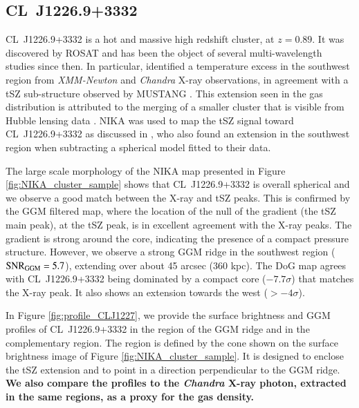\documentclass[twocolumn,traditabstract]{aa}
\begin{document}
\subsection{CL~J1226.9+3332}
\mbox{CL~J1226.9+3332} is a hot and massive high redshift cluster, at $z=0.89$. It was discovered by ROSAT \citep{Ebeling2001} and has been the object of several multi-wavelength studies since then. In particular, \cite{Maughan2007} identified a temperature excess in the southwest region from \textit{XMM-Newton} and \textit{Chandra} X-ray observations, in agreement with a tSZ sub-structure observed by MUSTANG \citep{Korngut2011}. This extension seen in the gas distribution is attributed to the merging of a smaller cluster that is visible from Hubble lensing data \citep{Jee2009}. NIKA was used to map the tSZ signal toward \mbox{CL~J1226.9+3332} as discussed in \cite{Adam2015}, who also found an extension in the southwest region when subtracting a spherical model fitted to their data.

The large scale morphology of the NIKA map presented in Figure \ref{fig:NIKA_cluster_sample} shows that \mbox{CL~J1226.9+3332} is overall spherical and we observe a good match between the X-ray and tSZ peaks. This is confirmed by the GGM filtered map, where the location of the null of the gradient (the tSZ main peak), at the tSZ peak, is in excellent agreement with the X-ray peaks. The gradient is strong around the core, indicating the presence of a compact pressure structure. However, we observe a strong GGM ridge in the southwest region (${\rm SNR}_{\rm GGM} = 5.7$), extending over about 45 arcsec (360 kpc). The DoG map agrees with \mbox{CL~J1226.9+3332} being dominated by a compact core ($-7.7 \sigma$) that matches the X-ray peak. It also shows an extension towards the west ($> -4 \sigma$).

In Figure \ref{fig:profile_CLJ1227}, we provide the surface brightness and GGM profiles of \mbox{CL~J1226.9+3332} in the region of the GGM ridge and in the complementary region. The region is defined by the cone shown on the surface brightness image of Figure \ref{fig:NIKA_cluster_sample}. It is designed to enclose the tSZ extension and to point in a direction perpendicular to the GGM ridge. {\bf We also compare the profiles to the \textit{Chandra} X-ray photon, extracted in the same regions, as a proxy for the gas density.}
\end{document}
